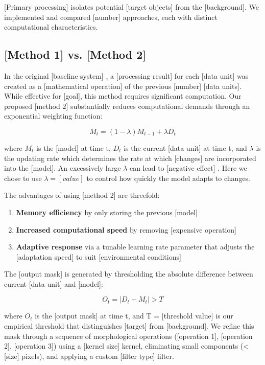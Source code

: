 [Primary processing] isolates potential [target objects] from the [background]. We implemented and compared [number] approaches, each with distinct computational characteristics.

\subsection{[Method 1] vs. [Method 2]}

In the original [baseline system] \cite{sample2022reference}, a [processing result] for each [data unit] was created as a [mathematical operation] of the previous [number] [data units]. While effective for [goal], this method requires significant computation. Our proposed [method 2] substantially reduces computational demands through an exponential weighting function:

\begin{equation}
M_t = (1 - \lambda)M_{t-1} + \lambda D_t
\label{eq:method_equation}
\end{equation}

where $M_t$ is the [model] at time t, $D_t$ is the current [data unit] at time t, and $\lambda$ is the updating rate which determines the rate at which [changes] are incorporated into the [model]. An excessively large $\lambda$ can lead to [negative effect] \cite{sample2010reference}. Here we chose to use $\lambda = [value]$ to control how quickly the model adapts to changes.

The advantages of using [method 2] are threefold:
\begin{enumerate}
\item \textbf{Memory efficiency} by only storing the previous [model]
\item \textbf{Increased computational speed} by removing [expensive operation]
\item \textbf{Adaptive response} via a tunable learning rate parameter that adjusts the [adaptation speed] to suit [environmental conditions]
\end{enumerate}

The [output mask] is generated by thresholding the absolute difference between current [data unit] and [model]:

\begin{equation}
O_t = |D_t - M_t| > T
\label{eq:output_mask}
\end{equation}

where $O_t$ is the [output mask] at time t, and T = [threshold value] is our empirical threshold that distinguishes [target] from [background]. We refine this mask through a sequence of morphological operations ([operation 1], [operation 2], [operation 3]) using a [kernel size] kernel, eliminating small components (< [size] pixels), and applying a custom [filter type] filter.

